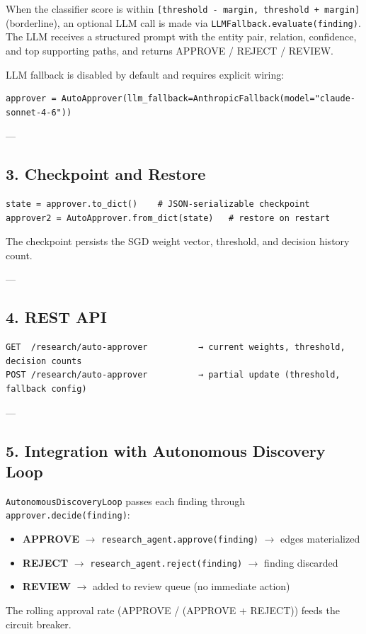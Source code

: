 When the classifier score is within \texttt{[threshold - margin, threshold + margin]} (borderline), an optional LLM call is made via \texttt{LLMFallback.evaluate(finding)}. The LLM receives a structured prompt with the entity pair, relation, confidence, and top supporting paths, and returns APPROVE / REJECT / REVIEW.

LLM fallback is disabled by default and requires explicit wiring:
\begin{lstlisting}
approver = AutoApprover(llm_fallback=AnthropicFallback(model="claude-sonnet-4-6"))
\end{lstlisting}

---

\subsection{3. Checkpoint and Restore}

\begin{lstlisting}
state = approver.to_dict()    # JSON-serializable checkpoint
approver2 = AutoApprover.from_dict(state)   # restore on restart
\end{lstlisting}

The checkpoint persists the SGD weight vector, threshold, and decision history count.

---

\subsection{4. REST API}

\begin{lstlisting}
GET  /research/auto-approver          → current weights, threshold, decision counts
POST /research/auto-approver          → partial update (threshold, fallback config)
\end{lstlisting}

---

\subsection{5. Integration with Autonomous Discovery Loop}

\texttt{AutonomousDiscoveryLoop} passes each finding through \texttt{approver.decide(finding)}:
\begin{itemize}
\item \textbf{APPROVE} $\to$ \texttt{research\_agent.approve(finding)} $\to$ edges mater\-ialized
\item \textbf{REJECT} $\to$ \texttt{research\_agent.reject(finding)} $\to$ finding discarded
\item \textbf{REVIEW} $\to$ added to review queue (no immediate action)

\end{itemize}
The rolling approval rate (APPROVE / (APPROVE + REJECT)) feeds the circuit breaker.

